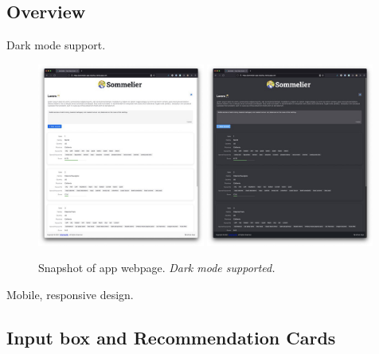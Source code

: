 \documentclass[
]{kaohandt}
\begin{document}
\subsection*{Overview}

Dark mode support.

\begin{figure}[h]
	\includegraphics[width=0.49\textwidth]{sommelier-view-01.jpg}
	\includegraphics[width=0.49\textwidth]{sommelier-view-02.jpg}
	\caption{Snapshot of app webpage. \emph{Dark mode supported.}}
	\label{fig:app_overview}
\end{figure}

Mobile, responsive design.

\subsection*{Input box and Recommendation Cards}
\end{document}
